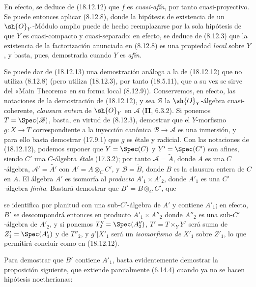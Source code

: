 En efecto, se deduce de (18.12.12) que $f$ es \emph{cuasi-afín}, por tanto cuasi-proyectivo. Se puede entonces aplicar (8.12.8), donde la hipótesis de existencia de un $\sh{O}_Y$-Módulo amplio puede de hecho reemplazarse por la sola hipótesis de que $Y$ es cuasi-compacto y cuasi-separado: en efecto, se deduce de (8.12.3) que la existencia de la factorización anunciada en (8.12.8) es una propiedad \emph{local} sobre $Y$, y basta, pues, demostrarla cuando $Y$ es \emph{afín}.

\begin{remark}[18.12.14]
\label{IV.18.12.14}
Se puede dar de (18.12.13) una demostración análoga a la de (18.12.12) que no utiliza (8.12.8) (pero utiliza (18.12.3), por tanto (18.5.11), que a su vez se sirve del «Main Theorem» en su forma local (8.12.9)). Conservemos, en efecto, las notaciones de la demostración de (18.12.12), y sea $\mathscr B$ la $\sh{O}_Y$-álgebra cuasi-coherente, \emph{clausura entera} de $\sh{O}_Y$ en $\mathscr A$ (\textbf{II}, 6.3.2). Si ponemos $T=\Spec(\mathscr B)$, basta, en virtud de (8.12.3), demostrar que el $Y$-morfismo $g:X\to T$ correspondiente a la inyección canónica $\mathscr B\to\mathscr A$ es una inmersión, y para ello basta demostrar (17.9.1) que $g$ es étale y radicial. Con las notaciones de (18.12.12), podemos suponer que $Y=\Spec(C)$ y $Y'=\Spec(C')$ son afines, siendo $C'$ una $C$-álgebra \emph{étale} (17.3.2); por tanto $\mathscr A=\widetilde A$, donde $A$ es una $C$-álgebra, $\mathscr A'=\widetilde{A'}$ con $A'=A\otimes_C C'$, y $\mathscr B=\widetilde B$, donde $B$ es la clausura entera de $C$ en $A$. El álgebra $A'$ es isomorfa al \emph{producto} $A'_1\times A'_2$, donde $A'_1$ es una $C'$-álgebra \emph{finita}. Bastará demostrar que $B'=B\otimes_C C'$, que


se identifica por planitud con una sub-$C'$-álgebra de $A'$ y contiene $A'_1$; en efecto, $B'$ se descompondrá entonces en producto $A'_1\times A''_2$ donde $A''_2$ es una sub-$C'$-álgebra de $A'_2$, y si ponemos $T''_2=\Spec(A''_2)$, $T'=T\times_Y Y'$ será suma de $Z'_1=\Spec(A'_1)$ y de $T''_2$, y $g'|X'_1$ será un \emph{isomorfismo de} $X'_1$ sobre $Z'_1$, lo que permitirá concluir como en (18.12.12).

Para demostrar que $B'$ contiene $A'_1$, basta evidentemente demostrar la proposición siguiente, que extiende parcialmente (6.14.4) cuando ya no se hacen hipótesis noetherianas:
\end{remark}

